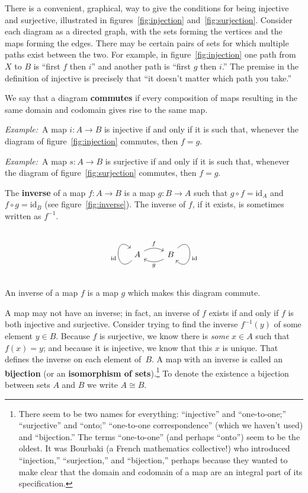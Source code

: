 \documentclass[12pt, a4paper]{article}
\newcommand{\defn}[1]{\textbf{#1}}
\newcommand{\eg}{\emph{Example:}\relax}
\newcommand{\id}{\text{id}}
\begin{document}
There is a convenient, graphical, way to give the conditions for being
injective and surjective, illustrated in figures~\ref{fig:injection}
and~\ref{fig:surjection}. Consider each diagram as a directed graph,
with the sets forming the vertices and the maps forming the
edges. There may be certain pairs of sets for which multiple paths
exist between the two. For example, in figure~\ref{fig:injection} one
path from $X$ to $B$ is “first $f$ then $i$” and another path is
“first $g$ then $i$.” The premise in the definition of injective is
precisely that “it doesn't matter which path you take.”

We say that a diagram \defn{commutes} if every composition of maps
resulting in the same domain and codomain gives rise to the same map.

\eg\ A map $i\colon A\to B$ is injective if and only if it is such that,
whenever the diagram of figure~\ref{fig:injection} commutes, then
$f=g$.

\eg\ A map $s\colon A\to B$ is surjective if and only if it is such that,
whenever the diagram of figure~\ref{fig:surjection} commutes, then
$f=g$.

The \defn{inverse} of a map $f\colon A\to B$ is a map $g\colon B\to A$
such that $g\circ f = \id_A$ and $f\circ g = \id_B$ (see
figure~\ref{fig:inverse}). The inverse of $f$, if it exists, is
sometimes written as $f^{-1}$.
\begin{sidefigure}
  \[\begin{tikzcd}
  A \arrow[loop left, out=225, in=135, distance=3em, "\id"] \arrow[r, bend
      left, "f"] &
    B \arrow[l, bend left, "g"] \arrow[loop right, out=45, in=-45,
      distance=3em, "\id"]
  \end{tikzcd}\]
  \caption{An inverse of a map $f$ is a map $g$ which makes this
    diagram commute.\label{fig:inverse}}
\end{sidefigure}
A map may not have an inverse; in fact, an inverse of $f$ exists if
and only if $f$ is both injective and surjective. Consider trying to
find the inverse $f^{-1}(y)$ of some element $y\in B$. Because $f$ is
surjective, we know there is \emph{some} $x\in A$ such that $f(x) = y$;
and because it is injective, we know that this $x$ is unique. That
defines the inverse on each element of~$B$. A map with an inverse is
called an \defn{bijection} (or an \defn{isomorphism of
  sets}).\footnote{There seem to be two names for everything:
“injective” and “one-to-one;” “surjective” and “onto;” “one-to-one
correspondence” (which we haven't used) and “bijection.”  The terms
“one-to-one” (and perhaps “onto”) seem to be the oldest. It was
Bourbaki (a French mathematics collective!) who introduced
“injection,” “surjection,” and “bijection,” perhaps because they
wanted to make clear that the domain and codomain of a map are an
integral part of its specification.} To denote the existence a
bijection between sets $A$ and $B$ we write $A\cong B$. 
\end{document}
